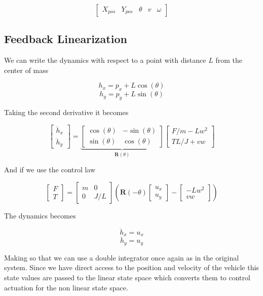 \documentclass[12pt]{article}
\begin{document}
\begin{equation*}
    \begin{bmatrix}
        X_{pos}&Y_{pos}&\theta&v&\omega
    \end{bmatrix}
\end{equation*}

\subsection{Feedback Linearization}
We can write the dynamics with respect to a point with distance $L$ from the center of mass  

\[
h_x = p_x + L \cos(\theta)
\]
\[
h_y = p_y + L \sin(\theta)
\]

Taking the second derivative it becomes 

\[
\begin{bmatrix}
    \ddot{h}_x \\
    \ddot{h}_y
\end{bmatrix}
=
\underbrace{
\begin{bmatrix}
    \cos(\theta) & -\sin(\theta) \\
    \sin(\theta) & \cos(\theta)
\end{bmatrix}
}_{\mathbf{R}(\theta)}
\begin{bmatrix}
    F/m - L w^2 \\
    TL/J + v w
\end{bmatrix}
\]

And if we use the control law  

\[
\begin{bmatrix}
F \\
T
\end{bmatrix}
=
\begin{bmatrix}
m & 0 \\
0 & J/L
\end{bmatrix}
\left(
\mathbf{R}(-\theta)
\begin{bmatrix}
u_x \\
u_y
\end{bmatrix}
-
\begin{bmatrix}
- L w^2 \\
v w
\end{bmatrix}
\right)
\]

The dynamics becomes  

\[
\ddot{h}_x = u_x
\]
\[
\ddot{h}_y = u_y
\]

Making so that we can use a double integrator once again as in the original system.
Since we have direct access to the position and velocity of the vehicle this state values are passed to the linear state space
which converts them to control actuation for the non linear state space.
\end{document}
